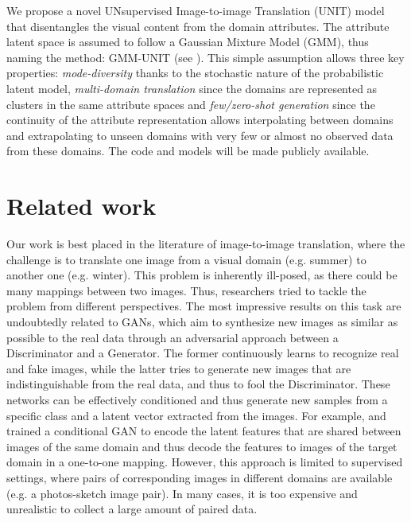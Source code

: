 \documentclass[runningheads]{llncs}
\begin{document}
We propose a novel UNsupervised Image-to-image Translation (UNIT) model that disentangles the visual content from the domain attributes. The attribute latent space is assumed to follow a Gaussian Mixture Model (GMM), thus naming the method: GMM-UNIT (see ). This simple assumption allows three key properties: \textit{mode-diversity} thanks to the stochastic nature of the probabilistic latent model, \textit{multi-domain translation} since the domains are represented as clusters in the same attribute spaces and \textit{few/zero-shot generation} since the continuity of the attribute representation allows interpolating between domains and extrapolating to unseen domains with very few or almost no observed data from these domains. The code and models will be made publicly available.



















\section{Related work}
\vspace{-2mm}
Our work is best placed in the literature of image-to-image translation, where the challenge is to translate one image from a visual domain (e.g. summer) to another one (e.g. winter). This problem is inherently ill-posed, as there could be many mappings between two images. Thus, researchers tried to tackle the problem from different perspectives. The most impressive results on this task are undoubtedly related to GANs, which aim to synthesize new images as similar as possible to the real data through an adversarial approach between a Discriminator and a Generator. The former continuously learns to recognize real and fake images, while the latter tries to generate new images that are indistinguishable from the real data, and thus to fool the Discriminator. 
These networks can be effectively conditioned and thus generate new samples from a specific class \cite{chen2016infogan} and a latent vector extracted from the images. For example, \cite{isola2017image} and \cite{wang2018high} trained a conditional GAN to encode the latent features that are shared between images of the same domain and thus decode the features to images of the target domain in a one-to-one mapping. 
However, this approach is limited to supervised settings, where pairs of corresponding images in different domains are available (e.g. a photos-sketch image pair). In many cases, it is too expensive and unrealistic to collect a large amount of paired data. 
\end{document}
